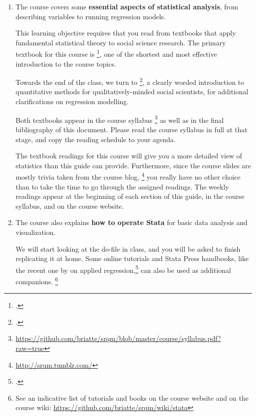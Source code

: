 \begin{enumerate}
  

	\label{sec:textbooks}%
  \item The course covers some \textbf{essential aspects of statistical analysis}, from describing variables to running regression models.%
  
  This learning objective requires that you read from textbooks that apply fundamental statistical theory to social science research. The primary textbook for this course is \footcite{Urdan:2010a}, one of the shortest and most effective introduction to the course topics. %
	
	Towards the end of the class, we turn to \footcite{FeinsteinThomas:2002d}, a clearly worded introduction to quantitative methods for qualitatively-minded social scientists, for additional clarifications on regression modelling.%
  
  Both textbooks appear in the course syllabus%
		\footnote{\url{https://github.com/briatte/srqm/blob/master/course/syllabus.pdf?raw=true}} %
    as well as in the final bibliography of this document. Please read the course syllabus in full at that stage, and copy the reading schedule to your agenda.%
		
  The textbook readings for this course will give you a more detailed view of statistics than this guide can provide. Furthermore, since the course slides are mostly trivia taken from the course blog,%
  \footnote{\url{http://srqm.tumblr.com/}} %
    you really have no other choice than to take the time to go through the assigned readings. The weekly readings appear at the beginning of each section of this guide, in the course syllabus, and on the course website.%


  \item The course also explains \textbf{how to operate Stata} for basic data analysis and visualization.%

     We will start looking at the do-file in class, and you will be asked to finish replicating it at home. Some online tutorials and Stata Press handbooks, like the recent one by \citeauthor{Mitchell:2012a} on applied regression,\footcite{Mitchell:2012a} can also be used as additional companions.%
		\footnote{See an indicative list of tutorials and books on the course website and on the course wiki: \url{https://github.com/briatte/srqm/wiki/stata}} %
    

\end{enumerate}
